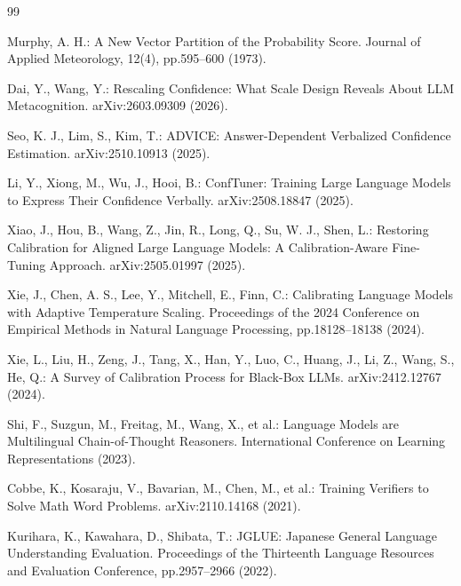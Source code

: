 \begin{thebibliography}{99}
{ Murphy, A. H.: A New Vector Partition of the Probability Score. Journal of Applied Meteorology, 12(4), pp.595--600 (1973).

 Dai, Y., Wang, Y.: Rescaling Confidence: What Scale Design Reveals About LLM Metacognition. arXiv:2603.09309 (2026).

 Seo, K. J., Lim, S., Kim, T.: ADVICE: Answer-Dependent Verbalized Confidence Estimation. arXiv:2510.10913 (2025).

 Li, Y., Xiong, M., Wu, J., Hooi, B.: ConfTuner: Training Large Language Models to Express Their Confidence Verbally. arXiv:2508.18847 (2025).

 Xiao, J., Hou, B., Wang, Z., Jin, R., Long, Q., Su, W. J., Shen, L.: Restoring Calibration for Aligned Large Language Models: A Calibration-Aware Fine-Tuning Approach. arXiv:2505.01997 (2025).

 Xie, J., Chen, A. S., Lee, Y., Mitchell, E., Finn, C.: Calibrating Language Models with Adaptive Temperature Scaling. Proceedings of the 2024 Conference on Empirical Methods in Natural Language Processing, pp.18128--18138 (2024).

 Xie, L., Liu, H., Zeng, J., Tang, X., Han, Y., Luo, C., Huang, J., Li, Z., Wang, S., He, Q.: A Survey of Calibration Process for Black-Box LLMs. arXiv:2412.12767 (2024).

 Shi, F., Suzgun, M., Freitag, M., Wang, X., et al.: Language Models are Multilingual Chain-of-Thought Reasoners. International Conference on Learning Representations (2023).

 Cobbe, K., Kosaraju, V., Bavarian, M., Chen, M., et al.: Training Verifiers to Solve Math Word Problems. arXiv:2110.14168 (2021).

 Kurihara, K., Kawahara, D., Shibata, T.: JGLUE: Japanese General Language Understanding Evaluation. Proceedings of the Thirteenth Language Resources and Evaluation Conference, pp.2957--2966 (2022).


}
\end{thebibliography}
